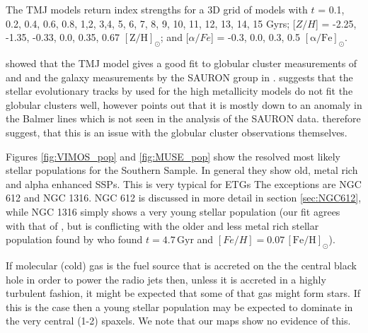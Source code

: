 		The TMJ models return index strengths for a 3D grid of models with $t$ = 0.1, 0.2, 0.4, 0.6, 0.8, 1,2, 3,4, 5, 6, 7, 8, 9, 10, 11, 12, 13, 14, 15 Gyrs; [$Z/H$] = -2.25, -1.35, -0.33, 0.0, 0.35, 0.67 $\mathrm{[Z/H]_\odot}$; and [$\alpha/Fe$] = -0.3, 0.0, 0.3, 0.5 $\mathrm{[\alpha/Fe]_\odot}$.

		\citet{Thomas2010} showed that the TMJ model gives a good fit to globular cluster measurements of \citet{Puzia2002} and \citet{Schiavon2005} and the galaxy measurements by the SAURON group in \citet{Kuntschner2010}. \citet{Conroy2010} suggests that the stellar evolutionary tracks by \citet{Girardi2000} used for the high metallicity models do not fit the globular clusters well, however \citet{Thomas2010} points out that it is mostly down to an anomaly in the Balmer lines which is not seen in the analysis of the SAURON data. \citet{Thomas2010} therefore suggest, that this is an issue with the globular cluster observations themselves. 

		Figures \ref{fig:VIMOS_pop} and \ref{fig:MUSE_pop} show the resolved most likely stellar populations for the Southern Sample. In general they show old, metal rich and alpha enhanced SSPs. This is very typical for ETGs %
		The exceptions are NGC 612 and NGC 1316. NGC 612 is discussed in more detail in section \ref{sec:NGC612}, while NGC 1316 simply shows a very young stellar population (our fit agrees with that of \citealt{Kuntschner2000}, but is conflicting with the older and less metal rich stellar population found by \citealt{Koleva2011} who found $t=4.7\,\mathrm{Gyr}$ and $[Fe/H]=0.07 \,\mathrm{[Fe/H]_\odot}$). 

		If molecular (cold) gas is the fuel source that is accreted on the the central black hole in order to power the radio jets then, unless it is accreted in a highly turbulent fashion, it might be expected that some of that gas might form stars. If this is the case then a young stellar population may be expected to dominate in the very central (1-2) spaxels. We note that our maps show no evidence of this. 


